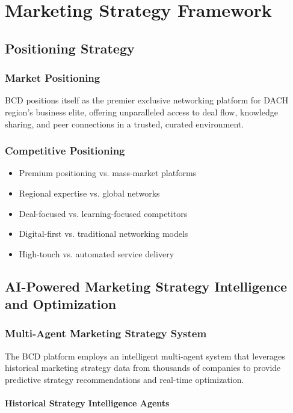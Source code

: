 \chapter{Marketing Strategy Framework}

\section{Positioning Strategy}

\subsection{Market Positioning}
BCD positions itself as the premier exclusive networking platform for DACH region's business elite, offering unparalleled access to deal flow, knowledge sharing, and peer connections in a trusted, curated environment.

\subsection{Competitive Positioning}
\begin{itemize}
    \item Premium positioning vs. mass-market platforms
    \item Regional expertise vs. global networks
    \item Deal-focused vs. learning-focused competitors
    \item Digital-first vs. traditional networking models
    \item High-touch vs. automated service delivery
\end{itemize}

\section{AI-Powered Marketing Strategy Intelligence and Optimization}

\subsection{Multi-Agent Marketing Strategy System}

The BCD platform employs an intelligent multi-agent system that leverages historical marketing strategy data from thousands of companies to provide predictive strategy recommendations and real-time optimization.

\subsubsection{Historical Strategy Intelligence Agents}


